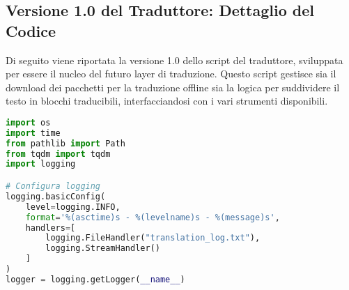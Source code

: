 \documentclass[a4paper,12pt]{article}
\begin{document}
\subsection{Versione 1.0 del Traduttore: Dettaglio del Codice}
Di seguito viene riportata la versione 1.0 dello script del traduttore, sviluppata per essere il nucleo del futuro layer di traduzione. Questo script gestisce sia il download dei pacchetti per la traduzione offline sia la logica per suddividere il testo in blocchi traducibili, interfacciandosi con i vari strumenti disponibili.

\begin{lstlisting}[language=Python, caption=Versione 1.0 del traduttore]
import os
import time
from pathlib import Path
from tqdm import tqdm
import logging

# Configura logging
logging.basicConfig(
    level=logging.INFO,
    format='%(asctime)s - %(levelname)s - %(message)s',
    handlers=[
        logging.FileHandler("translation_log.txt"),
        logging.StreamHandler()
    ]
)
logger = logging.getLogger(__name__)


\end{lstlisting}
\end{document}
